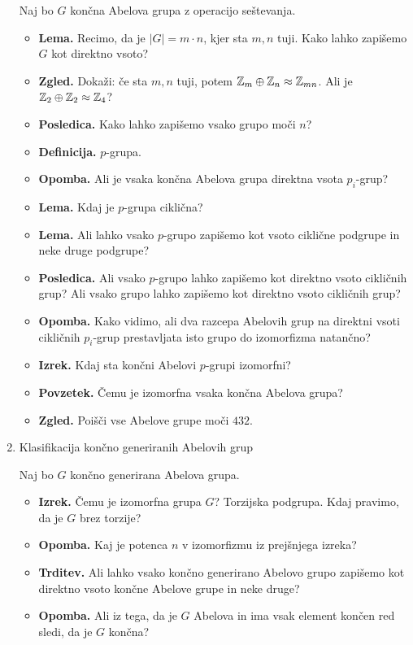 \begin{enumerate}
    Naj bo \(G\) končna Abelova grupa z operacijo seštevanja.
    \begin{itemize}
        \item \textbf{Lema.} Recimo, da je \(|G| = m \cdot n\), kjer sta \(m, n\) tuji. Kako lahko zapišemo \(G\) kot direktno vsoto?
        \item \textbf{Zgled.} Dokaži: če sta \(m, n\) tuji, potem \(\mathbb{Z}_m \oplus \mathbb{Z}_n \approx \mathbb{Z}_{mn}\). Ali je \(\mathbb{Z}_2 \oplus \mathbb{Z}_2 \approx \mathbb{Z}_4\)?
        \item \textbf{Posledica.} Kako lahko zapišemo vsako grupo moči \(n\)?
        \item \textbf{Definicija.} \(p\)-grupa.
        \item \textbf{Opomba.} Ali je vsaka končna Abelova grupa direktna vsota \(p_i\)-grup?
        \item \textbf{Lema.} Kdaj je \(p\)-grupa ciklična?
        \item \textbf{Lema.} Ali lahko vsako \(p\)-grupo zapišemo kot vsoto ciklične podgrupe in neke druge podgrupe?
        \item \textbf{Posledica.} Ali vsako \(p\)-grupo lahko zapišemo kot direktno vsoto cikličnih grup? Ali vsako grupo lahko zapišemo kot direktno vsoto cikličnih grup?
        \item \textbf{Opomba.} Kako vidimo, ali dva razcepa Abelovih grup na direktni vsoti cikličnih \(p_i\)-grup prestavljata isto grupo do izomorfizma natančno?
        \item \textbf{Izrek.} Kdaj sta končni Abelovi \(p\)-grupi izomorfni?
        \item \textbf{Povzetek.} Čemu je izomorfna vsaka končna Abelova grupa? \todo{*}
        \item \textbf{Zgled.} Poišči vse Abelove grupe moči \(432\).
    \end{itemize}

    \item Klasifikacija končno generiranih Abelovih grup
    
    Naj bo \(G\) končno generirana Abelova grupa.
    \begin{itemize}
        \item \textbf{Izrek.} Čemu je izomorfna grupa \(G\)? Torzijska podgrupa. Kdaj pravimo, da je \(G\) brez torzije? \todo{*}
        \item \textbf{Opomba.} Kaj je potenca \(n\) v izomorfizmu iz prejšnjega izreka?
        \item \textbf{Trditev.} Ali lahko vsako končno generirano Abelovo grupo zapišemo kot direktno vsoto končne Abelove grupe in neke druge?
        \item \textbf{Opomba.} Ali iz tega, da je \(G\) Abelova in ima vsak element končen red sledi, da je \(G\) končna?
    \end{itemize}


\end{enumerate}
